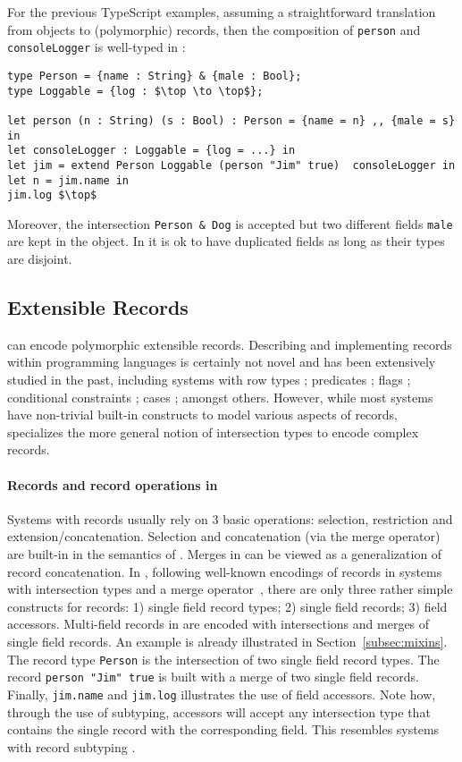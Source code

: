 For the previous TypeScript examples, assuming a straightforward
translation from objects to (polymorphic) records, then the
composition of \lstinline{person} and \lstinline{consoleLogger} is
well-typed in \name:

\begin{lstlisting}[mathescape=true]
type Person = {name : String} & {male : Bool};
type Loggable = {log : $\top \to \top$};

let person (n : String) (s : Bool) : Person = {name = n} ,, {male = s} in
let consoleLogger : Loggable = {log = ...} in
let jim = extend Person Loggable (person "Jim" true)  consoleLogger in
let n = jim.name in
jim.log $\top$
\end{lstlisting}

Moreover, the intersection \lstinline$Person & Dog$ is accepted but
two different fields \lstinline$male$ are kept in the object. In \name
it is ok to have duplicated fields as long as their types are
disjoint. 

\subsection{Extensible Records}
\name can encode polymorphic extensible records. Describing and
implementing records within programming languages is certainly not
novel and has been extensively studied in the past, including
systems with row types \cite{wand1987complete,wand1989type}; 
predicates \cite{harper1990extensible,harper1991record,gaster1996polymorphic}; 
flags \cite{remy1993type}; conditional constraints \cite{pottier2003constraint};
cases \cite{blume2006extensible}; amongst others. However, while 
most systems have non-trivial built-in constructs to model various aspects of
records, \name specializes the more general notion of intersection
types to encode complex records.

\paragraph{Records and record operations in \name}
Systems with records usually rely on 3 basic operations: selection,
restriction and extension/concatenation.  Selection and concatenation
(via the merge operator) are built-in in the semantics of
\name. Merges in \name can be viewed as a generalization of record
concatenation.  In \name, following well-known encodings of records in
systems with intersection types and a merge operator~\cite{}, there are only three rather simple constructs
for records: 1) single field record types; 2) single field records; 3)
field accessors. Multi-field records in \name are encoded with
intersections and merges of single field records. An example is
already illustrated in Section~\ref{subsec:mixins}.  The record type
\lstinline$Person$ is the intersection of two single field record
types. The record \lstinline$person "Jim" true$ is built with a merge
of two single field records. Finally, \lstinline{jim.name} and
\lstinline{jim.log} illustrates the use of field accessors.  Note how,
through the use of subtyping, accessors will accept any intersection
type that contains the single record with the corresponding field.
This resembles systems with record subtyping
\cite{cardelli1990operations,pierce1994simple}.


